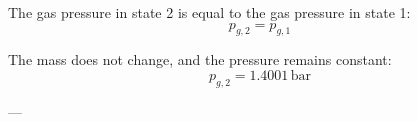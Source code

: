 The gas pressure in state 2 is equal to the gas pressure in state 1:  
\[
p_{g,2} = p_{g,1}
\]

The mass does not change, and the pressure remains constant:  
\[
p_{g,2} = 1.4001 \, \text{bar}
\]

---